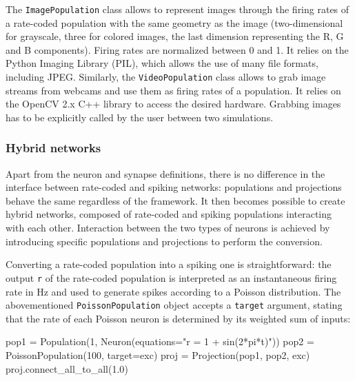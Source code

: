 \documentclass[
  11pt,
  a4paper,
]{scrbook}
\newenvironment{Shaded}{}{}
\newcommand{\DecValTok}[1]{\textcolor[rgb]{0.00,0.36,0.77}{#1}}
\newcommand{\FloatTok}[1]{\textcolor[rgb]{0.00,0.36,0.77}{#1}}
\newcommand{\NormalTok}[1]{\textcolor[rgb]{0.14,0.16,0.18}{#1}}
\newcommand{\OperatorTok}[1]{\textcolor[rgb]{0.14,0.16,0.18}{#1}}
\newcommand{\StringTok}[1]{\textcolor[rgb]{0.01,0.18,0.38}{#1}}
\begin{document}
The \texttt{ImagePopulation} class allows to represent images through
the firing rates of a rate-coded population with the same geometry as
the image (two-dimensional for grayscale, three for colored images, the
last dimension representing the R, G and B components). Firing rates are
normalized between 0 and 1. It relies on the Python Imaging Library
(PIL), which allows the use of many file formats, including JPEG.
Similarly, the \texttt{VideoPopulation} class allows to grab image
streams from webcams and use them as firing rates of a population. It
relies on the OpenCV 2.x C++ library to access the desired hardware.
Grabbing images has to be explicitly called by the user between two
simulations.

\subsubsection*{Hybrid networks}\label{hybrid-networks}

Apart from the neuron and synapse definitions, there is no difference in
the interface between rate-coded and spiking networks: populations and
projections behave the same regardless of the framework. It then becomes
possible to create hybrid networks, composed of rate-coded and spiking
populations interacting with each other. Interaction between the two
types of neurons is achieved by introducing specific populations and
projections to perform the conversion.

Converting a rate-coded population into a spiking one is
straightforward: the output \texttt{r} of the rate-coded population is
interpreted as an instantaneous firing rate in Hz and used to generate
spikes according to a Poisson distribution. The abovementioned
\texttt{PoissonPopulation} object accepts a \texttt{target} argument,
stating that the rate of each Poisson neuron is determined by its
weighted sum of inputs:

\begin{Shaded}
\begin{Highlighting}[]
\NormalTok{pop1 }\OperatorTok{=}\NormalTok{ Population(}\DecValTok{1}\NormalTok{, Neuron(equations}\OperatorTok{=}\StringTok{"r = 1 + sin(2*pi*t)"}\NormalTok{))}
\NormalTok{pop2 }\OperatorTok{=}\NormalTok{ PoissonPopulation(}\DecValTok{100}\NormalTok{, target}\OperatorTok{=}\StringTok{\textquotesingle{}exc\textquotesingle{}}\NormalTok{)}
\NormalTok{proj }\OperatorTok{=}\NormalTok{ Projection(pop1, pop2, }\StringTok{\textquotesingle{}exc\textquotesingle{}}\NormalTok{)}
\NormalTok{proj.connect\_all\_to\_all(}\FloatTok{1.0}\NormalTok{)}
\end{Highlighting}
\end{Shaded}
\end{document}
